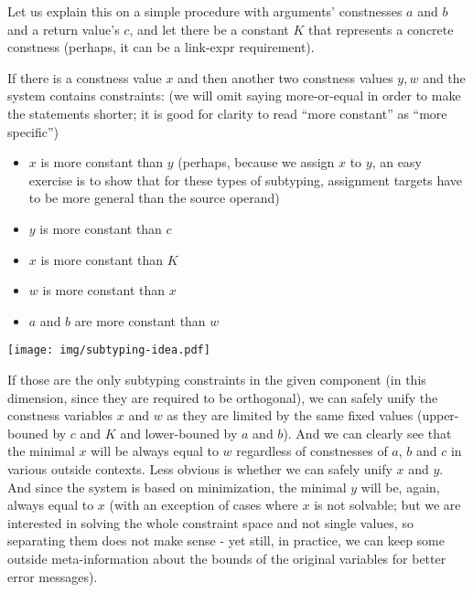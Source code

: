 \begin{ex}
\label{subtyping-idea}

Let us explain this on a simple procedure with arguments' constnesses $a$ and $b$ and a return value's $c$, and let there be a constant $K$ that represents a concrete constness (perhaps, it can be a link-expr requirement).

If there is a constness value $x$ and then another two constness values $y, w$ and the system contains constraints: (we will omit saying more-or-equal in order to make the statements shorter; it is good for clarity to read ``more constant'' as ``more specific'')

\begin{itemize}
    \item $x$ is more constant than $y$ (perhaps, because we assign $x$ to $y$, an easy exercise is to show that for these types of subtyping, assignment targets have to be more general than the source operand)
    \item $y$ is more constant than $c$
    \item $x$ is more constant than $K$
    \item $w$ is more constant than $x$
    \item $a$ and $b$ are more constant than $w$
\end {itemize}

\centerline{\texttt{[image: img/subtyping-idea.pdf]}}

If those are the only subtyping constraints in the given component (in this dimension, since they are required to be orthogonal), we can safely unify the constness variables $x$ and $w$ as they are limited by the same fixed values (upper-bouned by $c$ and $K$ and lower-bouned by $a$ and $b$). And we can clearly see that the minimal $x$ will be always equal to $w$ regardless of constnesses of $a$, $b$ and $c$ in various outside contexts. Less obvious is whether we can safely unify $x$ and $y$. And since the system is based on minimization, the minimal $y$ will be, again, always equal to $x$ (with an exception of cases where $x$ is not solvable; but we are interested in solving the whole constraint space and not single values, so separating them does not make sense - yet still, in practice, we can keep some outside meta-information about the bounds of the original variables for better error messages).


\end{ex}
